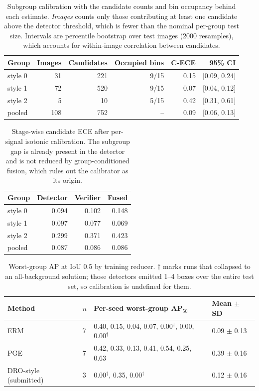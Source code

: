 \begin{table}[t]
\centering
\small
\caption{Subgroup calibration with the candidate counts and bin occupancy behind each estimate. \emph{Images} counts only those contributing at least one candidate above the detector threshold, which is fewer than the nominal per-group test size. Intervals are percentile bootstrap over test images (2000 resamples), which accounts for within-image correlation between candidates.}
\label{tab:subgroup_counts}
\begin{tabular}{lrrrrr}
\toprule
Group & Images & Candidates & Occupied bins & C-ECE & 95\% CI \\
\midrule
style 0 & 31 & 221 & 9/15 & 0.15 & [0.09, 0.24] \\
style 1 & 72 & 520 & 9/15 & 0.07 & [0.04, 0.12] \\
style 2 & 5 & 10 & 5/15 & 0.42 & [0.31, 0.61] \\
\midrule
pooled & 108 & 752 & -- & 0.09 & [0.06, 0.13] \\
\bottomrule
\end{tabular}
\end{table}


\begin{table}[t]
\centering
\small
\caption{Stage-wise candidate ECE after per-signal isotonic calibration. The subgroup gap is already present in the detector and is not reduced by group-conditioned fusion, which rules out the calibrator as its origin.}
\label{tab:stage_decomp}
\begin{tabular}{lrrr}
\toprule
Group & Detector & Verifier & Fused \\
\midrule
style 0 & 0.094 & 0.102 & 0.148 \\
style 1 & 0.097 & 0.077 & 0.069 \\
style 2 & 0.299 & 0.371 & 0.423 \\
pooled & 0.087 & 0.086 & 0.086 \\
\bottomrule
\end{tabular}
\end{table}


\begin{table}[t]
\centering
\small
\caption{Worst-group AP at IoU 0.5 by training reducer. $\dagger$ marks runs that collapsed to an all-background solution; those detectors emitted 1--4 boxes over the entire test set, so calibration is undefined for them.}
\label{tab:reducers}
\begin{tabular}{llll}
\toprule
Method & $n$ & Per-seed worst-group AP$_{50}$ & Mean $\pm$ SD \\
\midrule
ERM & 7 & 0.40, 0.15, 0.04, 0.07, 0.00$^{\dagger}$, 0.00, 0.00$^{\dagger}$ & 0.09 $\pm$ 0.13 \\
PGE & 7 & 0.42, 0.33, 0.13, 0.41, 0.54, 0.25, 0.63 & 0.39 $\pm$ 0.16 \\
DRO-style (submitted) & 3 & 0.00$^{\dagger}$, 0.35, 0.00$^{\dagger}$ & 0.12 $\pm$ 0.16 \\
\bottomrule
\end{tabular}
\end{table}


